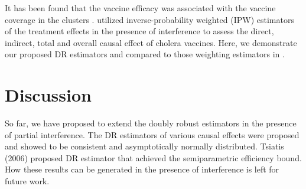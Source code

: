 \documentclass[oupdraft]{bio}
\begin{document}
It has been found that the vaccine efficacy was associated with the vaccine coverage in the clusters \citep{ali2005herd,root2011role}. \citet{PerezHeydrich2014interference} utilized inverse-probability weighted (IPW) estimators of the treatment effects in the presence of interference to assess the direct, indirect, total and overall causal effect of cholera vaccines. Here, we demonstrate our proposed DR estimators and compared to those weighting estimators in \citet{PerezHeydrich2014interference}.





\vspace{-.3cm}
\section{Discussion}\label{sec: DR_discussion}
\vspace{3mm}

So far, we have proposed to extend the doubly robust estimators in the presence of partial interference. The DR estimators of various causal effects were proposed and showed to be consistent and asymptotically normally distributed. Tsiatis (2006)\nocite{tsiatis2006semiparametric} proposed DR estimator that achieved the semiparametric efficiency bound. How these results can be generated in the presence of interference is left for future work.
\end{document}
